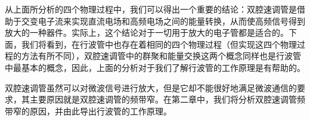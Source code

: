 从上面所分析的四个物理过程中，我们可以得出一个重要的结论：双腔速调管是借助于交变电子流来实现直流电场和高频电场之间的能量转换，从而使高频信号得到放大的一种器件。实际上，这个结论对于一切用于放大的电子管都是适合的。下面，我们将看到，在行波管中也存在着相同的四个物理过程（但实现这四个物理过程的方法有所不同），双腔速调管中的群聚和能量交换这两个概念同样也是行波管中最基本的概念，因此，上面的分析对于我们了解行波管的工作原理是有帮助的。

双腔速调管虽然可以对微波信号进行放大，但是它却不能很好地满足微波通信的要求，其主要原因就是双腔速调管的频带窄。在第二章中，我们将分析双腔速调管频带窄的原因，并由此导出行波管的工作原理。

